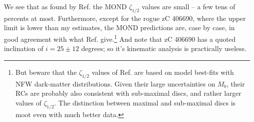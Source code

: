 \documentclass[twocolumn,showpacs,amsmath,amssymb,prd,nofootinbib]
{revtex4}
\def\sss{\scriptscriptstyle}
\def\_#1{_{\sss #1}}
\def\zef{\zeta\_{1/2}}
\begin{document}
\par
We see that as found by Ref. \cite{genzel17} the MOND $\zef$ values are small -- a few tens of percents at most. Furthermore, except for the rogue zC 406690, where the upper limit is lower than my estimates, the MOND predictions are, case by case, in good agreement with what Ref. \cite{genzel17} give.\footnote{But beware that the $\zef$ values of Ref. \cite{genzel17} are based on model best-fits with NFW dark-matter distributions. Given their large uncertainties on $M_b$, their RCs are probably also consistent with sub-maximal discs, and rather larger values of $\zef$. The distinction between maximal and sub-maximal discs is moot even with much better data.\label{fnq}} And note that zC 406690 has a quoted inclination of $i=25\pm 12$ degrees; so it's kinematic analysis is practically useless.
\end{document}
